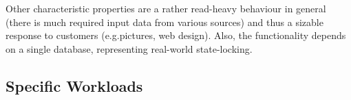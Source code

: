 \documentclass[../main.tex]{subfiles}
\begin{document}
Other characteristic properties are a rather read-heavy behaviour in general 
(there is much required input data from various sources) 
and thus a sizable response to customers (e.g.\@ pictures, web design). 
Also, the functionality depends on a single database, representing real-world state-locking.


\subsection{Specific Workloads}\label{ssec:webshopSpecificWorkloads}
\end{document}
